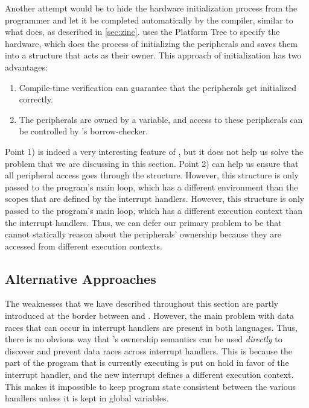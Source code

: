 Another attempt would be to hide the hardware initialization process from the programmer and let it be completed automatically by the compiler, similar to what {\zinc} does, as described in \autoref{sec:zinc}.
{\zinc} uses the Platform Tree to specify the hardware, which does the process of initializing the peripherals and saves them into a  structure that acts as their owner.
This approach of initialization has two advantages:

\begin{enumerate}[\hspace{13pt}1)]
    \item Compile-time verification can guarantee that the peripherals get initialized correctly.
    \item The peripherals are owned by a variable, and access to these peripherals can be controlled by {\rust}'s borrow-checker.
\end{enumerate}

Point 1) is indeed a very interesting feature of {\zinc}, but it does not help us solve the problem that we are discussing in this section.
Point 2) can help us ensure that all peripheral access goes through the  structure.
However, this structure is only passed to the program's main loop, which has a different environment than the scopes that are defined by the interrupt handlers.
However, this structure is only passed to the program's main loop, which has a different execution context than the interrupt handlers.
Thus, we can defer our primary problem to be that {\rust} cannot statically reason about the peripherals' ownership because they are accessed from different execution contexts.

\subsection{Alternative Approaches}

The weaknesses that we have described throughout this section are partly introduced at the border between {\rust} and {\C}.
However, the main problem with data races that can occur in interrupt handlers are present in both languages.
Thus, there is no obvious way that {\rust}'s ownership semantics can be used \emph{directly} to discover and prevent data races across interrupt handlers.
This is because the part of the program that is currently executing is put on hold in favor of the interrupt handler, and the new interrupt defines a different execution context.
This makes it impossible to keep program state consistent between the various handlers unless it is kept in global variables.

